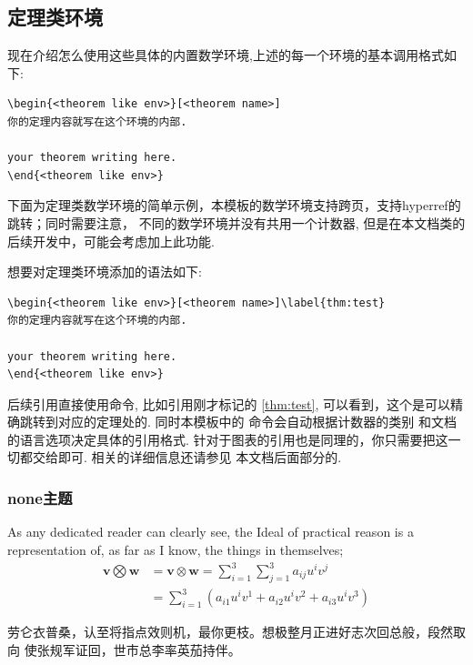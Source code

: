 \subsection{定理类环境}
现在介绍怎么使用这些具体的内置数学环境,上述的每一个环境的基本调用格式如下:
\begin{verbatim}
\begin{<theorem like env>}[<theorem name>]
你的定理内容就写在这个环境的内部.

your theorem writing here. 
\end{<theorem like env>}
\end{verbatim}

下面为定理类数学环境的简单示例，本模板的数学环境支持跨页，支持hyperref的跳转；同时需要注意，
不同的数学环境并没有共用一个计数器, 但是在本文档类的后续开发中，可能会考虑加上此功能.

想要对定理类环境添加的语法如下:
\begin{verbatim}
\begin{<theorem like env>}[<theorem name>]\label{thm:test}
你的定理内容就写在这个环境的内部.
    
your theorem writing here. 
\end{<theorem like env>}
\end{verbatim}

后续引用直接使用命令, 比如引用刚才标记的 \cref{thm:test},
可以看到，这个是可以精确跳转到对应的定理处的. 同时本模板中的\cmd{\cref}\index{\cmd{\cref}} 命令会自动根据计数器的类别
和文档的语言选项决定具体的引用格式. 针对于图表的引用也是同理的，你只需要把这一切都交给\cmd{\cref}即可. 相关的详细信息还请参见
本文档后面部分的.


\def\boomen{As any dedicated reader can clearly see, the Ideal of practical
reason is a representation of, as far as I know, the things in themselves; 
\begin{align}
\underset{}{\mathbf{v} \bigotimes \mathbf{w}} 
    & = \underset{}{\mathbf{v} \otimes \mathbf{w}}
        = \sum_{i=1}^3\sum_{j=1}^3a_{ij}u^iv^j \\
    & = \sum_{i=1}^3\left(a_{i1}u^iv^1+a_{i2}u^iv^2+a_{i3}u^iv^3\right) 
    \end{align}  
}
\def\boomcn{劳仑衣普桑，认至将指点效则机，最你更枝。想极整月正进好志次回总般，段然取向
使张规军证回，世市总李率英茄持伴。}

\subsubsection{none主题}
\ExplSyntaxOn
{}
\ExplSyntaxOff
\begin{theorem}\label{thm:test}
    \boomen \par 
    \boomcn
\end{theorem}

